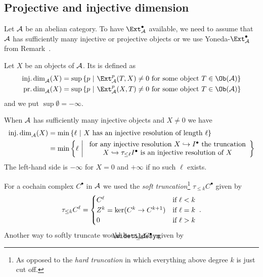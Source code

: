 \documentclass[a4paper,parskip=half,numbers=enddot, DIV=12]{scrreprt}
\begin{document}
\subsection{Projective and injective dimension}
Let $\mathcal{A}$ be an abelian category. To have $\Ext_\Aa^\bullet$ available, we need to assume that $\mathcal{A}$ has sufficiently many injective or projective objects or we use Yoneda-$\Ext_\Aa^\bullet$ from Remark~.
\begin{defi}
	Let $X$ be an objects of $\mathcal{A}$. Its  is defined as
	\begin{align*}
		\idim_\Aa(X)&=\sup\left\{p\st \Ext_\Aa^p(T,X)\neq 0\text{ for some object }T\in\Ob(\Aa)\right\}\\
		\pdim_\Aa(X)&=\sup\left\{p\st \Ext_\Aa^p(X,T)\neq 0\text{ for some object }T\in\Ob(\Aa)\right\}
	\end{align*}
	and we put $\sup\emptyset =-\infty$.
\end{defi}
\begin{fact}
	When $\mathcal{A}$ has sufficiently many injective objects and $X\neq 0$ we have
	\begin{align*}
		\idim_\Aa(X)&=\min\left\{\ell\st X\text{ has an injective resolution of length }\ell\right\}\\
	&=	\min\left\{\ell\st\begin{array}{c}
	\text{for any injective resolution }X\monomorphism I^\bullet\text{ the truncation}\\
	X\monomorphism\tau_{\leq\ell}I^\bullet\text{ is an injective resolution of }X
	\end{array}
	\right\}
	\end{align*}
	The left-hand side is $-\infty$ for $X=0$ and $+\infty$ if no such $\ell$ exists. 
\end{fact}
For a cochain complex $C^\bullet$ in $\mathcal{A}$ we used the \emph{soft truncation}\footnote{As opposed to the \emph{hard truncation} in which everything above degree $k$ is just cut off.} $\tau_{\leq k}C^\bullet$ given by 
\begin{align*}
	\tau_{\leq k}C^\ell=\begin{cases}
	C^\ell & \text{if }\ell<k\\
	Z^k=\ker(C^k\morphism C^{k+1}) & \text{if }\ell=k\\
	0 & \text{if }\ell>k
	\end{cases}\;.
\end{align*}
Another way to softly truncate would be $\snake{\tau}_{\leq k}C^\bullet$, given by
\end{document}

